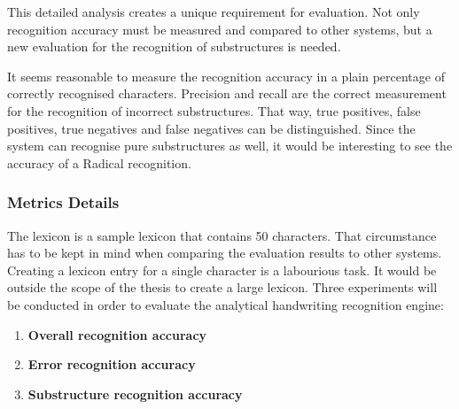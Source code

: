 This detailed analysis creates a unique requirement for evaluation. Not only
recognition accuracy must be measured and compared to other systems,
but a new evaluation for the recognition of substructures is needed.

It seems reasonable to measure the recognition accuracy in a plain 
percentage of correctly recognised characters. 
Precision and recall are the correct measurement for the recognition of 
incorrect substructures. That way, true positives, false positives, 
true negatives and false negatives can be distinguished.
Since the system can recognise pure substructures as well, it would 
be interesting to see the accuracy of a Radical recognition.

\subsubsection{Metrics Details}
\label{sec:eval:metricsdetails}

The lexicon is a sample lexicon that contains 50 characters. That circumstance
has to be kept in mind when comparing the evaluation results to other
systems. Creating a lexicon entry for a single character is a labourious task.
It would be outside the scope of the thesis to create a large lexicon.
Three experiments will be conducted in order to evaluate the analytical
handwriting recognition engine:
\begin{enumerate}
  \item \textbf{Overall recognition accuracy} \label{eval:enum:overall}
  \item \textbf{Error recognition accuracy} \label{eval:enum:errorrecognition}
  \item \textbf{Substructure recognition accuracy} \label{eval:enum:substructure}
\end{enumerate}


